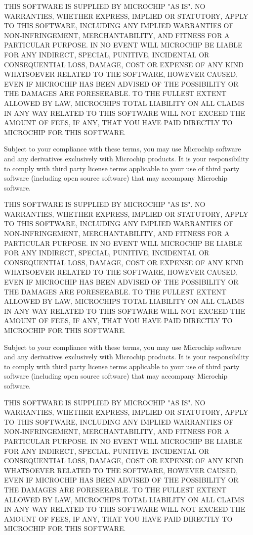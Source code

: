 THIS SOFTWARE IS SUPPLIED BY MICROCHIP "{}\+AS IS"{}. NO WARRANTIES, WHETHER EXPRESS, IMPLIED OR STATUTORY, APPLY TO THIS SOFTWARE, INCLUDING ANY IMPLIED WARRANTIES OF NON-\/\+INFRINGEMENT, MERCHANTABILITY, AND FITNESS FOR A PARTICULAR PURPOSE. IN NO EVENT WILL MICROCHIP BE LIABLE FOR ANY INDIRECT, SPECIAL, PUNITIVE, INCIDENTAL OR CONSEQUENTIAL LOSS, DAMAGE, COST OR EXPENSE OF ANY KIND WHATSOEVER RELATED TO THE SOFTWARE, HOWEVER CAUSED, EVEN IF MICROCHIP HAS BEEN ADVISED OF THE POSSIBILITY OR THE DAMAGES ARE FORESEEABLE. TO THE FULLEST EXTENT ALLOWED BY LAW, MICROCHIP\textquotesingle{}S TOTAL LIABILITY ON ALL CLAIMS IN ANY WAY RELATED TO THIS SOFTWARE WILL NOT EXCEED THE AMOUNT OF FEES, IF ANY, THAT YOU HAVE PAID DIRECTLY TO MICROCHIP FOR THIS SOFTWARE.

Subject to your compliance with these terms, you may use Microchip software and any derivatives exclusively with Microchip products. It is your responsibility to comply with third party license terms applicable to your use of third party software (including open source software) that may accompany Microchip software.

THIS SOFTWARE IS SUPPLIED BY MICROCHIP "{}\+AS IS"{}. NO WARRANTIES, WHETHER EXPRESS, IMPLIED OR STATUTORY, APPLY TO THIS SOFTWARE, INCLUDING ANY IMPLIED WARRANTIES OF NON-\/\+INFRINGEMENT, MERCHANTABILITY, AND FITNESS FOR A PARTICULAR PURPOSE. IN NO EVENT WILL MICROCHIP BE LIABLE FOR ANY INDIRECT, SPECIAL, PUNITIVE, INCIDENTAL OR CONSEQUENTIAL LOSS, DAMAGE, COST OR EXPENSE OF ANY KIND WHATSOEVER RELATED TO THE SOFTWARE, HOWEVER CAUSED, EVEN IF MICROCHIP HAS BEEN ADVISED OF THE POSSIBILITY OR THE DAMAGES ARE FORESEEABLE. TO THE FULLEST EXTENT ALLOWED BY LAW, MICROCHIP\textquotesingle{}S TOTAL LIABILITY ON ALL CLAIMS IN ANY WAY RELATED TO THIS SOFTWARE WILL NOT EXCEED THE AMOUNT OF FEES, IF ANY, THAT YOU HAVE PAID DIRECTLY TO MICROCHIP FOR THIS SOFTWARE.

Subject to your compliance with these terms, you may use Microchip software and any derivatives exclusively with Microchip products. It is your responsibility to comply with third party license terms applicable to your use of third party software (including open source software) that may accompany Microchip software.

THIS SOFTWARE IS SUPPLIED BY MICROCHIP "{}\+AS IS"{}. NO WARRANTIES, WHETHER EXPRESS, IMPLIED OR STATUTORY, APPLY TO THIS SOFTWARE, INCLUDING ANY IMPLIED WARRANTIES OF NON-\/\+INFRINGEMENT, MERCHANTABILITY, AND FITNESS FOR A PARTICULAR PURPOSE. IN NO EVENT WILL MICROCHIP BE LIABLE FOR ANY INDIRECT, SPECIAL, PUNITIVE, INCIDENTAL OR CONSEQUENTIAL LOSS, DAMAGE, COST OR EXPENSE OF ANY KIND WHATSOEVER RELATED TO THE SOFTWARE, HOWEVER CAUSED, EVEN IF MICROCHIP HAS BEEN ADVISED OF THE POSSIBILITY OR THE DAMAGES ARE FORESEEABLE. TO THE FULLEST EXTENT ALLOWED BY LAW, MICROCHIP\textquotesingle{}S TOTAL LIABILITY ON ALL CLAIMS IN ANY WAY RELATED TO THIS SOFTWARE WILL NOT EXCEED THE AMOUNT OF FEES, IF ANY, THAT YOU HAVE PAID DIRECTLY TO MICROCHIP FOR THIS SOFTWARE.

